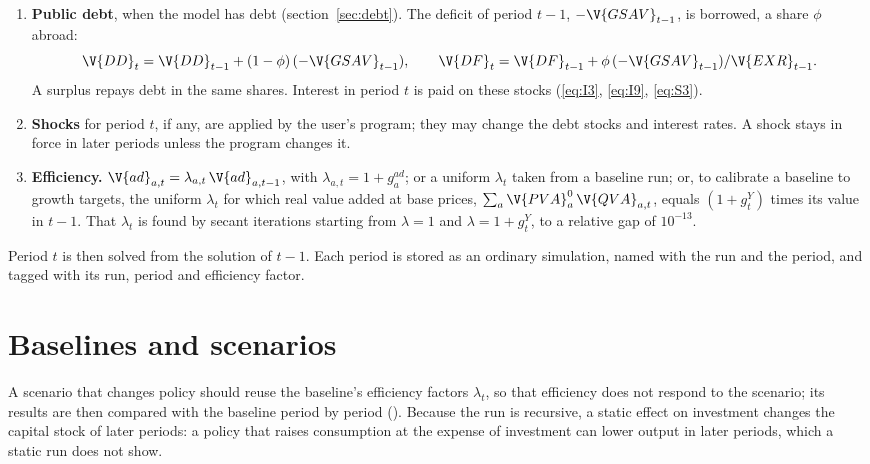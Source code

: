 \begin{enumerate}
$\V{trnsfr}_{d,gov}$, $\V{trnsfr}_{gov,gov}$ and $\V{trnsfr}_{shi,gov}$ grow at
$g_G$; flows in foreign currency ($\V{trnsfr}_{d,row}$, $\V{trnsfr}_{f,row}$,
$\V{trnsfr}_{gov,row}$, $\V{trnsfr}_{row,gov}$, $\V{trnsfr}_{shi,row}$, and
$\V{FSAV}$ when it is fixed) grow at $g_W$. Other fixed values, the numeraire
among them, are unchanged.
\item \textbf{Public debt}, when the model has debt
(section~\ref{sec:debt}). The deficit of period $t - 1$, $-\V{GSAV}_{t-1}$, is
borrowed, a share $\phi$ abroad:
\begin{equation*}
\V{DD}_t = \V{DD}_{t-1} + (1 - \phi)\,(-\V{GSAV}_{t-1}),
\qquad
\V{DF}_t = \V{DF}_{t-1} + \phi\,(-\V{GSAV}_{t-1}) / \V{EXR}_{t-1}.
\end{equation*}
A surplus repays debt in the same shares. Interest in period $t$ is paid on
these stocks (\eqref{eq:I3}, \eqref{eq:I9}, \eqref{eq:S3}).
\item \textbf{Shocks} for period $t$, if any, are applied by the user's
program; they may change the debt stocks and interest rates. A shock stays in
force in later periods unless the program changes it.
\item \textbf{Efficiency.} $\V{ad}_{a,t} = \lambda_{a,t}\,\V{ad}_{a,t-1}$, with
$\lambda_{a,t} = 1 + g^{ad}_a$; or a uniform $\lambda_t$ taken from a baseline
run; or, to calibrate a baseline to growth targets, the uniform $\lambda_t$ for
which real value added at base prices, $\sum_a \V{PVA}^0_a\,\V{QVA}_{a,t}$,
equals $(1 + g^Y_t)$ times its value in $t - 1$. That $\lambda_t$ is found by
secant iterations starting from $\lambda = 1$ and $\lambda = 1 + g^Y_t$, to a
relative gap of $10^{-13}$.
\end{enumerate}

Period $t$ is then solved from the solution of $t - 1$. Each period is stored
as an ordinary simulation, named with the run and the period, and tagged with
its run, period and efficiency factor.

\section{Baselines and scenarios}

A scenario that changes policy should reuse the baseline's efficiency factors
$\lambda_t$, so that efficiency does not respond to the scenario; its
results are then compared with the baseline period by period
(). Because the run is recursive, a static effect on
investment changes the capital stock of later periods: a policy that raises
consumption at the expense of investment can lower output in later periods,
which a static run does not show.

